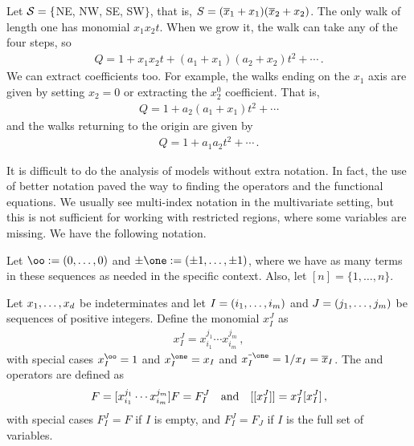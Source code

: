 \begin{exa} Let $\mathcal{S} = \{$NE, NW, SE, SW$\}$, that is, $S = (\overline{x}_1 + x_1)(\overline{x}_2 + x_2)$. The only walk of length one has monomial $x_1x_2t$. When we grow it, the walk can take any of the four steps, so
\begin{align}
	Q = 1 + x_1x_2t + (a_1 + x_1)(a_2 + x_2)t^2 + \cdots\,.
\end{align}
We can extract coefficients too. For example, the walks ending on the $x_1$ axis are given by setting $x_2 = 0$ or extracting the $x_2^0$ coefficient. That is,
\begin{align}
	[x_2^0]Q = 1 + a_2(a_1 + x_1)t^2 + \cdots
\end{align}
and the walks returning to the origin are given by
\begin{align}
	[x_1^0x_2^0]Q = 1 + a_1a_2t^2 + \cdots\,.
\end{align}
\end{exa}

It is difficult to do the analysis of \classic \highD models without extra notation. In fact, the use of better notation paved the way to finding the operators and the functional equations. We usually see multi-index notation in the multivariate setting, but this is not sufficient for working with restricted regions, where some variables are missing. We have the following notation. 

\begin{defn}Let $\oo := (0,\ldots,0)$ and $\pm \one := (\pm 1,\ldots, \pm 1)$, where we have as many terms in these sequences as needed in the specific context. Also, let $[n] = \{1,\ldots, n\}$.
\end{defn}

\begin{defn} Let $x_1,\ldots, x_d$ be indeterminates and let $I = (i_1,\ldots, i_m)$ and $J = (j_1,\ldots, j_m)$ be sequences of positive integers. Define the monomial $x_I^J$ as
\begin{align}
	x_I^J = x_{i_1}^{j_1}\cdots x_{i_m}^{j_m}\,,
\end{align}
with special cases $x_I^{\oo} = 1$ and $x_I^{\one} = x_I$ and $x_I^{\um\one} = 1/x_I = \ol x_I$. The  and  operators are defined as
\begin{align}
	[x_I^J] F= [x_{i_1}^{j_1}\cdots x_{i_m}^{j_m}]F = F_I^J \qandq [[x_I^J]] = x_I^J [x_I^J]\,,
\end{align}
with special cases $F_I^J = F$ if $I$ is empty, and $F_I^J = F_J$ if $I$ is the full set of variables.
\end{defn}

